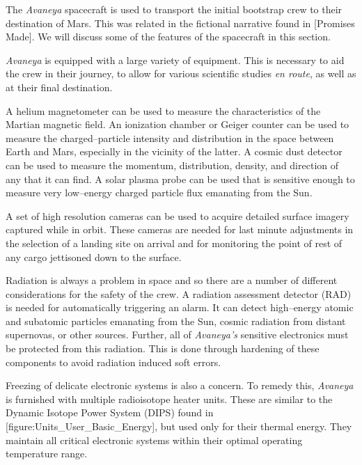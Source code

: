 

The {\it Avaneya} spacecraft is used to transport the initial bootstrap crew to their destination of Mars. This was related in the fictional narrative found in [Promises Made]. We will discuss some of the features of the spacecraft in this section.

{\it Avaneya} is equipped with a large variety of equipment. This is necessary to aid the crew in their journey, to allow for various scientific studies {\it en route}, as well as at their final destination.

A helium magnetometer can be used to measure the characteristics of the Martian magnetic field. An ionization chamber or Geiger counter can be used to measure the charged--particle intensity and distribution in the space between Earth and Mars, especially in the vicinity of the latter. A cosmic dust detector can be used to measure the momentum, distribution, density, and direction of any that it can find. A solar plasma probe can be used that is sensitive enough to measure very low--energy charged particle flux emanating from the Sun.

A set of high resolution cameras can be used to acquire detailed surface imagery captured while in orbit. These cameras are needed for last minute adjustments in the selection of a landing site on arrival and for monitoring the point of rest of any cargo jettisoned down to the surface.

Radiation is always a problem in space and so there are a number of different considerations for the safety of the crew. A radiation assessment detector (RAD) is needed for automatically triggering an alarm. It can detect high--energy atomic and subatomic particles emanating from the Sun, cosmic radiation from distant supernovas, or other sources. Further, all of {\it Avaneya's} sensitive electronics must be protected from this radiation. This is done through hardening of these components to avoid radiation induced soft errors.

Freezing of delicate electronic systems is also a concern. To remedy this, {\it Avaneya} is furnished with multiple radioisotope heater units. These are similar to the Dynamic Isotope Power System (DIPS) found in [figure:Units_User_Basic_Energy], but used only for their thermal energy. They maintain all critical electronic systems within their optimal operating temperature range.

